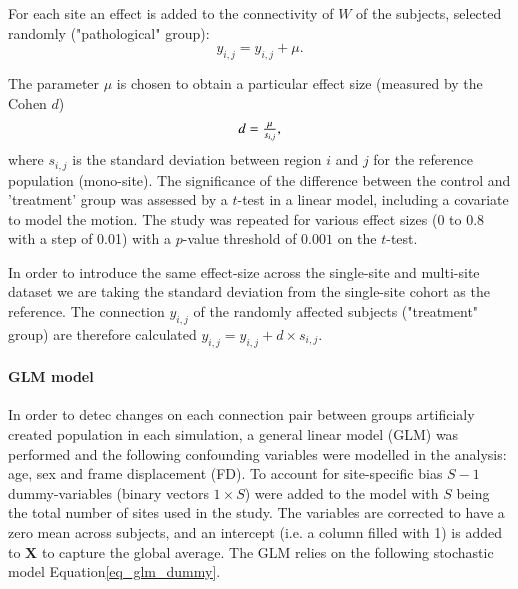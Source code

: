 \documentclass[authoryear]{elsarticle}
\begin{document}
For each site an effect is added to the connectivity of $W$ of the subjects, selected randomly ("pathological" group):
\begin{equation}
	y_{i,j} = y_{i,j} + \mu.
\end{equation}

The parameter $\mu$ is chosen to obtain a particular effect size (measured by the Cohen $d$)
\begin{equation}
\label{eq_cohen}
    \begin{array}{l l}
      d = \frac{\mu}{s_{i,j}},      
    \end{array}
\end{equation}
where $s_{i,j}$ is the standard deviation between region $i$ and $j$ for the reference population (mono-site). The significance of the difference between the control and 'treatment' group was assessed by a $t$-test in a linear model, including a covariate to model the motion. The study was repeated for various effect sizes (0 to 0.8 with a step of 0.01) with a $p$-value threshold of $0.001$ on the $t$-test.

In order to introduce the same effect-size across the single-site and multi-site dataset we are taking the standard deviation from the single-site cohort as the reference.  The connection $y_{i,j}$ of the randomly affected subjects ("treatment" group) are therefore calculated $y_{i,j} = y_{i,j} + d\times s_{i,j}$. 

\paragraph{GLM model} 
In order to detec changes on each connection pair between groups artificialy created population in each simulation, a general linear model (GLM) was performed and the following confounding variables were modelled in the analysis: age, sex and frame displacement (FD). To account for site-specific bias $S-1$ dummy-variables (binary vectors $1\times S$) were added to the model with $S$ being the total number of sites used in the study. The variables are corrected to have a zero mean across subjects, and an intercept (i.e. a column filled with 1) is added to $\mathbf{X}$ to capture the global average. The GLM relies on the following stochastic model Equation\ref{eq_glm_dummy}.
\end{document}
